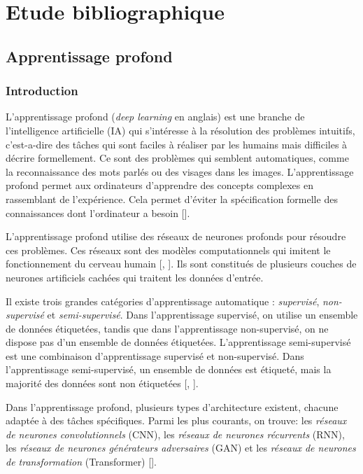 \part{Etude bibliographique}

\chapter{Apprentissage profond}

\section{Introduction}
L’apprentissage profond (\textit{deep learning} en anglais) est une branche de
l'intelligence artificielle (IA) qui s'intéresse à la résolution des problèmes
intuitifs, c'est-a-dire des tâches qui sont faciles à réaliser par les humains
mais difficiles à décrire formellement. Ce sont des problèmes qui semblent
automatiques, comme la reconnaissance des mots parlés ou des visages dans les
images. L'apprentissage profond permet aux ordinateurs d'apprendre des concepts
complexes en rassemblant de l'expérience. Cela permet d'éviter la spécification
formelle des connaissances dont l'ordinateur a besoin
	[\cite{Goodfellow-et-al-2016}].

\medskip
L'apprentissage profond utilise des réseaux de neurones profonds pour résoudre ces problèmes.
Ces réseaux sont des modèles computationnels qui imitent le fonctionnement
du cerveau humain [\cite{mcculloch_pitts_1943_nervous_activity}, \cite{rosenblatt_1958_perceptron}].
Ils sont constitués de plusieurs couches de neurones artificiels cachées qui traitent les données d'entrée.

\medskip
Il existe trois grandes catégories d'apprentissage automatique : \textit{supervisé}, \textit{non-supervisé} et \textit{semi-supervisé}. Dans l'apprentissage supervisé, on utilise un ensemble de données étiquetées, tandis que dans l'apprentissage non-supervisé, on ne dispose pas d'un ensemble de données étiquetées. L'apprentissage semi-supervisé est une combinaison d'apprentissage supervisé et non-supervisé. Dans l'apprentissage semi-supervisé, un ensemble de données est étiqueté, mais la majorité des données sont non étiquetées [\cite{Goodfellow-et-al-2016}, \cite{bishop_2016}].

\medskip
Dans l'apprentissage profond, plusieurs types d'architecture existent, chacune adaptée à des tâches spécifiques. Parmi les plus courants, on trouve: les \textit{réseaux de neurones convolutionnels} (CNN), les \textit{réseaux de neurones récurrents} (RNN), les \textit{réseaux de neurones générateurs adversaires} (GAN) et les \textit{réseaux de neurones de transformation} (Transformer) [\cite{Goodfellow-et-al-2016}].


